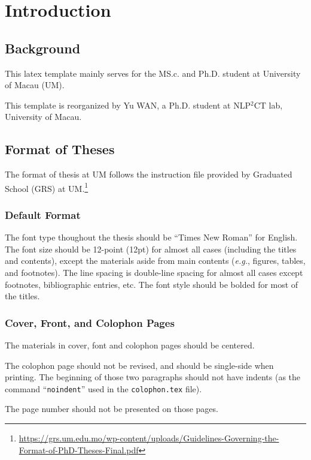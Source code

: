 \chapter{Introduction}
\label{chapter1}
\section{Background}
\label{chapter1.Background}

This latex template mainly serves for the MS.c. and Ph.D. student at University of Macau (UM).

This template is reorganized by Yu WAN, a Ph.D. student at NLP$^2$CT lab, University of Macau.


\section{Format of Theses}

The format of thesis at UM follows the instruction file provided by Graduated School (GRS) at UM.\footnote{ \href{https://grs.um.edu.mo/wp-content/uploads/Guidelines-Governing-the-Format-of-PhD-Theses-Final.pdf}{\url{https://grs.um.edu.mo/wp-content/uploads/Guidelines-Governing-the-Format-of-PhD-Theses-Final.pdf}}}

\subsection{Default Format}
The font type thoughout the thesis should be ``Times New Roman'' for English.
The font size should be 12-point (12pt) for almost all cases (including the titles and contents), except the materials aside from main contents (\textit{e.g.}, figures, tables, and footnotes).
The line spacing is double-line spacing for almost all cases except footnotes, bibliographic entries, etc.
The font style should be bolded for most of the titles.

\subsection{Cover, Front, and Colophon Pages}
The materials in cover, font and colophon pages should be centered.

The colophon page should not be revised, and should be single-side when printing.
The beginning of those two paragraphs should not have indents (as the command ``\texttt{noindent}'' used in the \texttt{colophon.tex} file).

The page number should not be presented on those pages.

